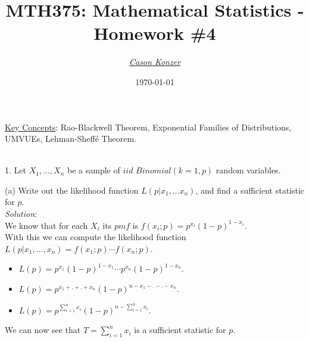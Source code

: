 \documentclass[12pt]{article}
\newcommand{\XB}{\color{black}}
\newcommand{\XBB}{\color{blue}}
\newcommand{\XV}{\color{violet}}
\newcommand{\ds}{\displaystyle}
\begin{document}
\title{\textbf{MTH375}: Mathematical Statistics - Homework \#4}
\date{\today}
\author{\XV\textit{\large{\href{https://github.com/casonk}{Cason Konzer}}}\XB}

\maketitle
\hrulefill
\vfill
    \underline{Key Concepts}: Rao-Blackwell Theorem, Exponential Families of Distributions, UMVUEs, Lehman-Sheff\'e Theorem.

\newpage
\newpage
\XBB\hrulefill\XB \\

1. Let $ X_{1}, \dots , X_{n} $ be a sample of $ iid $ $ Binomial(k=1, p) $ random variables. \\

\XBB\hrulefill\XB
\vspace{5mm}

(a) Write out the likelihood function $ L(p | x_{1}, \dots x_{n}) $, and find a sufficient statistic for $ p $.
\vspace{2.5mm} \\
\textit{Solution}:
\vspace{2.5mm} \\

\noindent
We know that for each $ X_{i} $ its $ pmf $ is $ f(x_{i}; p) = p^{x_{i}}(1 - p)^{1 - x_{i}} $. \\

With this we can compute the likelihood function $ L(p | x_{1}, \dots, x_{n}) = f(x_{1}; p) \cdots f(x_{n}; p) $.

\begin{itemize}
    \item $ \ds L(p) = p^{x_{1}}(1 - p)^{1 - x_{1}} \cdots p^{x_{n}}(1 - p)^{1 - x_{n}} $.
    \item $ \ds L(p) = p^{x_{1} + . + . + x_{n}}(1 - p)^{n - x_{1} - . - . - x_{n}} $.
    \item $ \ds L(p) = p^{\sum_{i=1}^{n} x_{i}}(1 - p)^{n - \sum_{i=1}^{n} x_{i}} $.
\end{itemize}

\noindent
We can now see that $ \ds T = \sum_{i=1}^{n} x_{i} $ is a sufficient statistic for $ p $. \\

\vspace{2.5mm}
\end{document}
